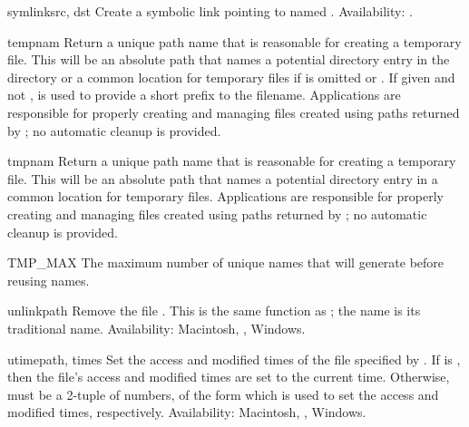 \begin{funcdesc}{symlink}{src, dst}
Create a symbolic link pointing to  named .
Availability: \UNIX{}.
\end{funcdesc}

\begin{funcdesc}{tempnam}{}
Return a unique path name that is reasonable for creating a temporary
file.  This will be an absolute path that names a potential directory
entry in the directory  or a common location for temporary
files if  is omitted or .  If given and not
,  is used to provide a short prefix to the
filename.  Applications are responsible for properly creating and
managing files created using paths returned by ;
no automatic cleanup is provided.
\end{funcdesc}

\begin{funcdesc}{tmpnam}{}
Return a unique path name that is reasonable for creating a temporary
file.  This will be an absolute path that names a potential directory
entry in a common location for temporary files.  Applications are
responsible for properly creating and managing files created using
paths returned by ; no automatic cleanup is
provided.
\end{funcdesc}

\begin{datadesc}{TMP_MAX}
The maximum number of unique names that  will
generate before reusing names.
\end{datadesc}

\begin{funcdesc}{unlink}{path}
Remove the file .  This is the same function as
; the  name is its traditional
\UNIX{} name.
Availability: Macintosh, \UNIX{}, Windows.
\end{funcdesc}

\begin{funcdesc}{utime}{path, times}
Set the access and modified times of the file specified by .
If  is , then the file's access and modified
times are set to the current time.  Otherwise,  must be a
2-tuple of numbers, of the form 
which is used to set the access and modified times, respectively.
Availability: Macintosh, \UNIX{}, Windows.
\end{funcdesc}


